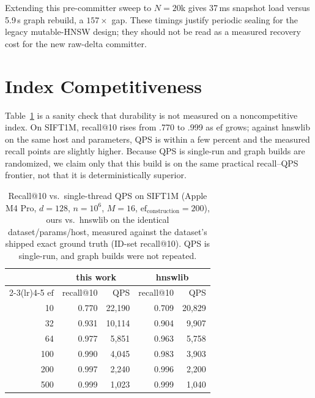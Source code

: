 \documentclass[sigconf,nonacm,balance=false]{acmart}
\begin{document}
Extending this pre-committer sweep to $N=20$k gives 37\,ms snapshot load versus
5.9\,s graph rebuild, a $157\times$ gap. These timings justify periodic sealing
for the legacy mutable-HNSW design; they should not be read as a measured recovery
cost for the new raw-delta committer.

\section{Index Competitiveness}
\label{sec:index}
Table~\ref{tab:recall} is a sanity check that durability is not measured on a
noncompetitive index. On SIFT1M, recall@10 rises from .770 to .999 as
$\mathrm{ef}$ grows; against hnswlib on the same host and parameters, QPS is
within a few percent and the measured recall points are slightly higher. Because
QPS is single-run and graph builds are randomized, we claim only that this build
is on the same practical recall--QPS frontier, not that it is deterministically
superior.

\begin{table}[t]
\centering
\caption{Recall@10 vs.\ single-thread QPS on SIFT1M (Apple M4 Pro, $d{=}128$,
$n{=}10^6$, $M{=}16$, $\mathrm{ef}_{\mathrm{construction}}{=}200$), ours vs.\
hnswlib on the identical dataset/params/host, measured against the dataset's
shipped exact ground truth (ID-set recall@10). QPS is single-run, and graph builds
were not repeated.}
\label{tab:recall}
\begin{tabular}{rrrrr}
\toprule
& \multicolumn{2}{c}{this work} & \multicolumn{2}{c}{hnswlib} \\
\cmidrule(lr){2-3}\cmidrule(lr){4-5}
$\mathrm{ef}$ & recall@10 & QPS & recall@10 & QPS \\
\midrule
10  & 0.770 & 22{,}190 & 0.709 & 20{,}829 \\
32  & 0.931 & 10{,}114 & 0.904 &  9{,}907 \\
64  & 0.977 &  5{,}851 & 0.963 &  5{,}758 \\
100 & 0.990 &  4{,}045 & 0.983 &  3{,}903 \\
200 & 0.997 &  2{,}240 & 0.996 &  2{,}200 \\
500 & 0.999 &  1{,}023 & 0.999 &  1{,}040 \\
\bottomrule
\end{tabular}
\end{table}
\end{document}
